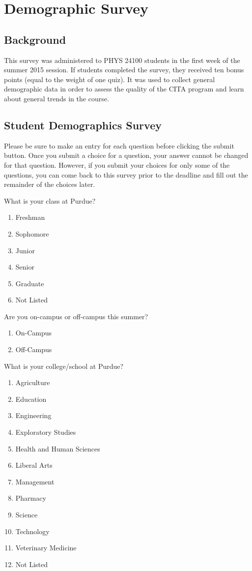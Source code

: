 \chapter[Demographic Survey]{Demographic Survey}

\section{Background}

This survey was administered to PHYS 24100 students in the first week of the summer 2015 session. If students completed the survey, they received ten bonus points (equal to the weight of one quiz). It was used to collect general demographic data in order to assess the quality of the CITA program and learn about general trends in the course.

\section{Student Demographics Survey}

Please be sure to make an entry for each question before clicking the submit button. Once you submit a choice for a question, your answer cannot be changed for that question. However, if you submit your choices for only some of the questions, you can come back to this survey prior to the deadline and fill out the remainder of the choices later.

What is your class at Purdue?

\begin{enumerate}
	\item Freshman
	\item Sophomore
	\item Junior
	\item Senior
	\item Graduate
	\item Not Listed
\end{enumerate}

Are you on-campus or off-campus this summer?

\begin{enumerate}
	\item On-Campus
	\item Off-Campus
\end{enumerate}

What is your college/school at Purdue?

\begin{enumerate}
	\item Agriculture
	\item Education
	\item Engineering
	\item Exploratory Studies
	\item Health and Human Sciences
	\item Liberal Arts
	\item Management
	\item Pharmacy
	\item Science
	\item Technology
	\item Veterinary Medicine
	\item Not Listed
\end{enumerate}

